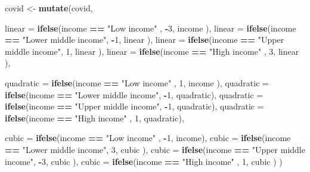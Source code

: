 \documentclass[]{article}
\newenvironment{Shaded}{\begin{snugshade}}{\end{snugshade}}
\newcommand{\KeywordTok}[1]{\textcolor[rgb]{0.13,0.29,0.53}{\textbf{#1}}}
\newcommand{\DataTypeTok}[1]{\textcolor[rgb]{0.13,0.29,0.53}{#1}}
\newcommand{\DecValTok}[1]{\textcolor[rgb]{0.00,0.00,0.81}{#1}}
\newcommand{\StringTok}[1]{\textcolor[rgb]{0.31,0.60,0.02}{#1}}
\newcommand{\OperatorTok}[1]{\textcolor[rgb]{0.81,0.36,0.00}{\textbf{#1}}}
\newcommand{\NormalTok}[1]{#1}
\begin{document}
\begin{Shaded}
\begin{Highlighting}[]
\NormalTok{covid <-}\StringTok{ }\KeywordTok{mutate}\NormalTok{(covid,}
              
              \DataTypeTok{linear =} \KeywordTok{ifelse}\NormalTok{(income }\OperatorTok{==}\StringTok{ "Low income"}\NormalTok{         , }\OperatorTok{-}\DecValTok{3}\NormalTok{, income ),}
              \DataTypeTok{linear =} \KeywordTok{ifelse}\NormalTok{(income }\OperatorTok{==}\StringTok{ "Lower middle income"}\NormalTok{, }\OperatorTok{-}\DecValTok{1}\NormalTok{, linear   ),}
              \DataTypeTok{linear =} \KeywordTok{ifelse}\NormalTok{(income }\OperatorTok{==}\StringTok{ "Upper middle income"}\NormalTok{,  }\DecValTok{1}\NormalTok{, linear   ),}
              \DataTypeTok{linear =} \KeywordTok{ifelse}\NormalTok{(income }\OperatorTok{==}\StringTok{ "High income"}\NormalTok{        ,  }\DecValTok{3}\NormalTok{, linear   ),}
              
              \DataTypeTok{quadratic =} \KeywordTok{ifelse}\NormalTok{(income }\OperatorTok{==}\StringTok{ "Low income"}\NormalTok{         ,  }\DecValTok{1}\NormalTok{, income ),}
              \DataTypeTok{quadratic =} \KeywordTok{ifelse}\NormalTok{(income }\OperatorTok{==}\StringTok{ "Lower middle income"}\NormalTok{, }\OperatorTok{-}\DecValTok{1}\NormalTok{, quadratic),}
              \DataTypeTok{quadratic =} \KeywordTok{ifelse}\NormalTok{(income }\OperatorTok{==}\StringTok{ "Upper middle income"}\NormalTok{, }\OperatorTok{-}\DecValTok{1}\NormalTok{, quadratic),}
              \DataTypeTok{quadratic =} \KeywordTok{ifelse}\NormalTok{(income }\OperatorTok{==}\StringTok{ "High income"}\NormalTok{        ,  }\DecValTok{1}\NormalTok{, quadratic),}
              
              \DataTypeTok{cubic =} \KeywordTok{ifelse}\NormalTok{(income }\OperatorTok{==}\StringTok{ "Low income"}\NormalTok{         , }\OperatorTok{-}\DecValTok{1}\NormalTok{, income),}
              \DataTypeTok{cubic =} \KeywordTok{ifelse}\NormalTok{(income }\OperatorTok{==}\StringTok{ "Lower middle income"}\NormalTok{,  }\DecValTok{3}\NormalTok{, cubic   ),}
              \DataTypeTok{cubic =} \KeywordTok{ifelse}\NormalTok{(income }\OperatorTok{==}\StringTok{ "Upper middle income"}\NormalTok{, }\OperatorTok{-}\DecValTok{3}\NormalTok{, cubic   ),}
              \DataTypeTok{cubic =} \KeywordTok{ifelse}\NormalTok{(income }\OperatorTok{==}\StringTok{ "High income"}\NormalTok{        ,  }\DecValTok{1}\NormalTok{, cubic   )}
\NormalTok{              )}
\end{Highlighting}
\end{Shaded}
\end{document}
